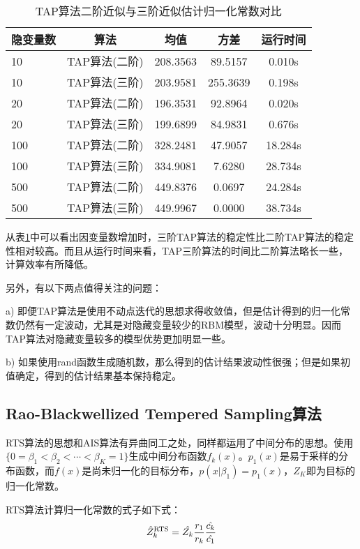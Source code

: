 \documentclass[11pt]{article}
\begin{document}
\begin{table}[!htbp]
  \centering  
  \begin{tabular}{lcccc} 
  \hline
  隐变量数 & 算法 & 均值 & 方差 & 运行时间\\ \hline
  10 & TAP算法(二阶)& 208.3563 & 89.5157 & 0.010s\\      
  10 & TAP算法(三阶) & 203.9581 & 255.3639& 0.198s\\ \hline
  20 & TAP算法(二阶)& 196.3531 & 92.8964& 0.020s\\      
  20 & TAP算法(三阶) & 199.6899 & 84.9831& 0.676s\\ \hline
  100 & TAP算法(二阶)& 328.2481 & 47.9057 & 18.284s\\      
  100 & TAP算法(三阶) & 334.9081 & 7.6280 & 28.734s\\ \hline
  500 & TAP算法(二阶)& 449.8376 & 0.0697 & 24.284s\\      
  500 & TAP算法(三阶) & 449.9967 & 0.0000& 38.734s\\ \hline
\end{tabular}
\caption{TAP算法二阶近似与三阶近似估计归一化常数对比}
\label{TAP_Result}
\end{table}

从表\ref{TAP_Result}中可以看出因变量数增加时，三阶TAP算法的稳定性比二阶TAP算法的稳定性相对较高。而且从运行时间来看，TAP三阶算法的时间比二阶算法略长一些，计算效率有所降低。

另外，有以下两点值得关注的问题：

a) 即便TAP算法是使用不动点迭代的思想求得收敛值，但是估计得到的归一化常数仍然有一定波动，尤其是对隐藏变量较少的RBM模型，波动十分明显。因而TAP算法对隐藏变量较多的模型优势更加明显一些。

b) 如果使用rand函数生成随机数，那么得到的估计结果波动性很强；但是如果初值确定，得到的估计结果基本保持稳定。


\subsection{Rao-Blackwellized Tempered Sampling算法}
RTS算法的思想和AIS算法有异曲同工之处，同样都运用了中间分布的思想。使用$\{0 = \beta_{1} < \beta_{2} < \cdots < \beta_{K} = 1\}$生成中间分布函数$f_{k}(x)$。$p_{1}(x)$是易于采样的分布函数，而$f(x)$是尚未归一化的目标分布，$p(x\vert\beta_{1}) = p_{1}(x)$，$Z_{K}$即为目标的归一化常数。\cite{RTS}

RTS算法计算归一化常数的式子如下式：
\[ \hat{Z}_{k}^{\rm RTS} = \hat{Z_{k}}\frac{r_{1}}{r_{k}}\frac{\hat{c_{k}}}{\hat{c_{1}}}\]
\end{document}
